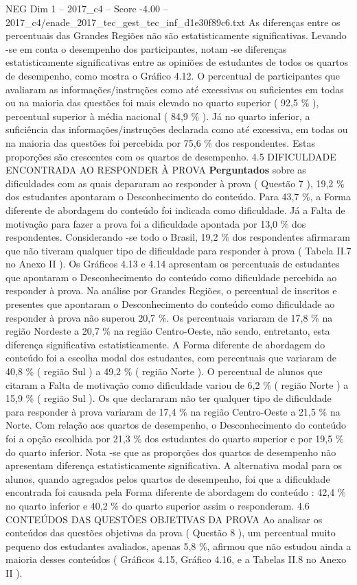 \begin{textsample}{NEG Dim 1 – 2017\_c4 – Score -4.00 – 2017\_c4/enade\_2017\_tec\_gest\_tec\_inf\_d1e30f89c6.txt}
As diferenças entre os percentuais das Grandes Regiões não são estatisticamente significativas.
Levando -se em conta o desempenho dos participantes, notam -se diferenças estatisticamente significativas entre as opiniões de estudantes de todos os quartos de desempenho, como mostra o Gráfico 4.12.
O percentual de participantes que avaliaram as informações/instruções como até excessivas ou suficientes em todas ou na maioria das questões foi mais elevado no quarto superior ( 92,5 \% ), percentual superior à média nacional ( 84,9 \% ).
Já no quarto inferior, a suficiência das informações/instruções declarada como até excessiva, em todas ou na maioria das questões foi percebida por 75,6 \% dos respondentes.
Estas proporções são crescentes com os quartos de desempenho. 4.5 DIFICULDADE ENCONTRADA AO RESPONDER À PROVA \textbf{Perguntados} sobre as dificuldades com as quais depararam ao responder à prova ( Questão 7 ), 19,2 \% dos estudantes apontaram o Desconhecimento do conteúdo.
Para 43,7 \%, a Forma diferente de abordagem do conteúdo foi indicada como dificuldade.
Já a Falta de motivação para fazer a prova foi a dificuldade apontada por 13,0 \% dos respondentes.
Considerando -se todo o Brasil, 19,2 \% dos respondentes afirmaram que não tiveram qualquer tipo de dificuldade para responder à prova ( Tabela II.7 no Anexo II ).
Os Gráficos 4.13 e 4.14 apresentam os percentuais de estudantes que apontaram o Desconhecimento do conteúdo como dificuldade percebida ao responder à prova.
Na análise por Grandes Regiões, o percentual de inscritos e presentes que apontaram o Desconhecimento do conteúdo como dificuldade ao responder à prova não superou 20,7 \%.
Os percentuais variaram de 17,8 \% na região Nordeste a 20,7 \% na região Centro-Oeste, não sendo, entretanto, esta diferença significativa estatisticamente.
A Forma diferente de abordagem do conteúdo foi a escolha modal dos estudantes, com percentuais que variaram de 40,8 \% ( região Sul ) a 49,2 \% ( região Norte ).
O percentual de alunos que citaram a Falta de motivação como dificuldade variou de 6,2 \% ( região Norte ) a 15,9 \% ( região Sul ).
Os que declararam não ter qualquer tipo de dificuldade para responder à prova variaram de 17,4 \% na região Centro-Oeste a 21,5 \% na Norte.
Com relação aos quartos de desempenho, o Desconhecimento do conteúdo foi a opção escolhida por 21,3 \% dos estudantes do quarto superior e por 19,5 \% do quarto inferior.
Nota -se que as proporções dos quartos de desempenho não apresentam diferença estatisticamente significativa.
A alternativa modal para os alunos, quando agregados pelos quartos de desempenho, foi que a dificuldade encontrada foi causada pela Forma diferente de abordagem do conteúdo : 42,4 \% no quarto inferior e 40,2 \% do quarto superior assim o responderam. 4.6 CONTEÚDOS DAS QUESTÕES OBJETIVAS DA PROVA Ao analisar os conteúdos das questões objetivas da prova ( Questão 8 ), um percentual muito pequeno dos estudantes avaliados, apenas 5,8 \%, afirmou que não estudou ainda a maioria desses conteúdos ( Gráficos 4.15, Gráfico 4.16, e a Tabelas II.8 no Anexo II ).

\end{textsample}
